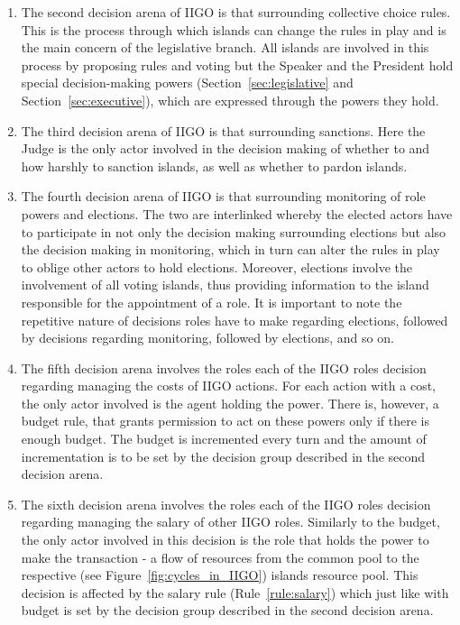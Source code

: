 \begin{itemize}
\begin{enumerate}
        \item The second decision arena of IIGO is that surrounding collective choice rules. This is the process through which islands can change the rules in play and is the main concern of the legislative branch. All islands are involved in this process by proposing rules and voting but the Speaker and the President hold special decision-making powers (Section~\ref*{sec:legislative} and Section~\ref*{sec:executive}), which are expressed through the powers they hold.
        
        \item The third decision arena of IIGO is that surrounding sanctions. Here the Judge is the only actor involved in the decision making of whether to and how harshly to sanction islands, as well as whether to pardon islands.
        
        \item The fourth decision arena of IIGO is that surrounding monitoring of role powers and elections. The two are interlinked whereby the elected actors have to participate in not only the decision making surrounding elections but also the decision making in monitoring, which in turn can alter the rules in play to oblige other actors to hold elections. Moreover, elections involve the involvement of all voting islands, thus providing information to the island responsible for the appointment of a role. It is important to note the repetitive nature of decisions roles have to make regarding elections, followed by decisions regarding monitoring, followed by elections, and so on.

        \item The fifth decision arena involves the roles each of the IIGO roles decision regarding managing the costs of IIGO actions. For each action with a cost, the only actor involved is the agent holding the power. There is, however, a budget rule, that grants permission to act on these powers only if there is enough budget. The budget is incremented every turn and the amount of incrementation is to be set by the decision group described in the second decision arena.
        
        \item The sixth decision arena involves the roles each of the IIGO roles decision regarding managing the salary of other IIGO roles. Similarly to the budget, the only actor involved in this decision is the role that holds the power to make the transaction - a flow of resources from the common pool to the respective (see Figure~\ref{fig:cycles_in_IIGO}) islands resource pool. This decision is affected by the salary rule (Rule~\ref{rule:salary}) which just like with budget is set by the decision group described in the second decision arena.
        

\end{enumerate}
\end{itemize}
